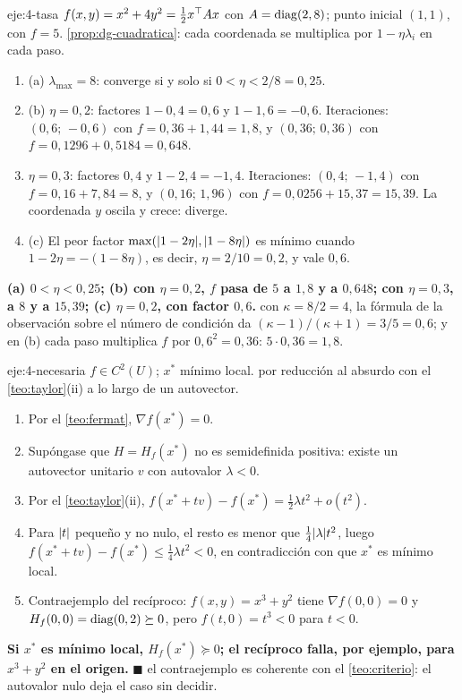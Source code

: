 \begin{solucion}{eje:4-tasa}
\datos $f(x,y)=x^{2}+4y^{2}=\tfrac12x^{\top} Ax$ con $A=\operatorname{diag}(2,8)$; punto inicial $(1,1)$, con $f=5$.
\planteamiento \cref{prop:dg-cuadratica}: cada coordenada se multiplica por $1-\eta\lambda_i$ en cada paso.
\pasos
\begin{enumerate}[label=\arabic*.]
  \item (a) $\lambda_{\max}=8$: converge si y solo si $0<\eta<2/8=0{,}25$.
  \item (b) $\eta=0{,}2$: factores $1-0{,}4=0{,}6$ y $1-1{,}6=-0{,}6$. Iteraciones: $(0{,}6;\,-0{,}6)$ con $f=0{,}36+1{,}44=1{,}8$, y $(0{,}36;\,0{,}36)$ con $f=0{,}1296+0{,}5184=0{,}648$.
  \item $\eta=0{,}3$: factores $0{,}4$ y $1-2{,}4=-1{,}4$. Iteraciones: $(0{,}4;\,-1{,}4)$ con $f=0{,}16+7{,}84=8$, y $(0{,}16;\,1{,}96)$ con $f=0{,}0256+15{,}37=15{,}39$. La coordenada $y$ oscila y crece: diverge.
  \item (c) El peor factor $\max(\lvert1-2\eta\rvert,\lvert1-8\eta\rvert)$ es mínimo cuando $1-2\eta=-(1-8\eta)$, es decir, $\eta=2/10=0{,}2$, y vale $0{,}6$.
\end{enumerate}
\resultado \textbf{(a) $0<\eta<0{,}25$; (b) con $\eta=0{,}2$, $f$ pasa de $5$ a $1{,}8$ y a $0{,}648$; con $\eta=0{,}3$, a $8$ y a $15{,}39$; (c) $\eta=0{,}2$, con factor $0{,}6$.}
\comprobacion con $\kappa=8/2=4$, la fórmula de la observación sobre el número de condición da $(\kappa-1)/(\kappa+1)=3/5=0{,}6$; y en (b) cada paso multiplica $f$ por $0{,}6^{2}=0{,}36$: $5\cdot 0{,}36=1{,}8$.
\end{solucion}

\begin{solucion}{eje:4-necesaria}
\datos $f\in C^{2}(U)$; $x^{*}$ mínimo local.
\planteamiento por reducción al absurdo con el \cref{teo:taylor}(ii) a lo largo de un autovector.
\pasos
\begin{enumerate}[label=\arabic*.]
  \item Por el \cref{teo:fermat}, $\nabla f(x^{*})=0$.
  \item Supóngase que $H=H_f(x^{*})$ no es semidefinida positiva: existe un autovector unitario $v$ con autovalor $\lambda<0$.
  \item Por el \cref{teo:taylor}(ii), $f(x^{*}+tv)-f(x^{*})=\tfrac12\lambda t^{2}+o(t^{2})$.
  \item Para $\lvert t\rvert$ pequeño y no nulo, el resto es menor que $\tfrac14\lvert\lambda\rvert t^{2}$, luego $f(x^{*}+tv)-f(x^{*})\le\tfrac14\lambda t^{2}<0$, en contradicción con que $x^{*}$ es mínimo local.
  \item Contraejemplo del recíproco: $f(x,y)=x^{3}+y^{2}$ tiene $\nabla f(0,0)=0$ y $H_f(0,0)=\operatorname{diag}(0,2)\succeq 0$, pero $f(t,0)=t^{3}<0$ para $t<0$.
\end{enumerate}
\resultado \textbf{Si $x^{*}$ es mínimo local, $H_f(x^{*})\succeq 0$; el recíproco falla, por ejemplo, para $x^{3}+y^{2}$ en el origen.} $\blacksquare$
\comprobacion el contraejemplo es coherente con el \cref{teo:criterio}: el autovalor nulo deja el caso sin decidir.
\end{solucion}

